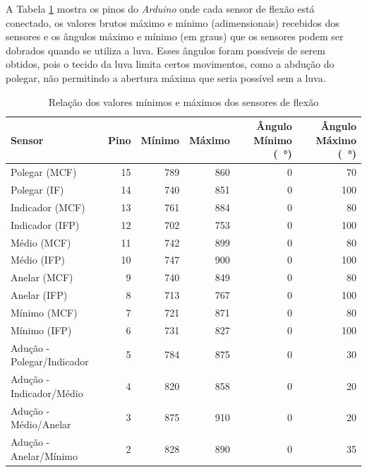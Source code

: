 A Tabela \ref{tab:sens_val} mostra os pinos do \textit{Arduino} onde cada sensor de flexão está conectado, os valores brutos máximo e mínimo (adimensionais) recebidos dos sensores e os ângulos máximo e mínimo (em graus) que os sensores podem ser dobrados quando se utiliza a luva. Esses ângulos foram possíveis de serem obtidos, pois o tecido da luva limita certos movimentos, como a abdução do polegar, não permitindo a abertura máxima que seria possível sem a luva.

\begin{table}[H]
    \centering
    \footnotesize
    \setlength{\abovecaptionskip}{0pt}
    \setlength{\belowcaptionskip}{0pt}
    \caption[Relação dos valores mínimos e máximos dos sensores de flexão]{Relação dos valores mínimos e máximos dos sensores de flexão}
    \label{tab:sens_val}
    \begin{tabular}{l r r r r r}
      \hline\hline
      Sensor & Pino & Mínimo & Máximo & Ângulo Mínimo (\SI{}{\degree}) & Ângulo Máximo (\SI{}{\degree})\\
      \hline
      Polegar (MCF)              & 15 & 789 & 860 & 0 & 70\\
      Polegar (IF)               & 14 & 740 & 851 & 0 & 100\\
      Indicador (MCF)            & 13 & 761 & 884 & 0 & 80\\
      Indicador (IFP)            & 12 & 702 & 753 & 0 & 100\\
      Médio (MCF)                & 11 & 742 & 899 & 0 & 80\\
      Médio (IFP)                & 10 & 747 & 900 & 0 & 100\\
      Anelar (MCF)               & 9  & 740 & 849 & 0 & 80\\
      Anelar (IFP)               & 8  & 713 & 767 & 0 & 100\\
      Mínimo (MCF)               & 7  & 721 & 871 & 0 & 80\\
      Mínimo (IFP)               & 6  & 731 & 827 & 0 & 100\\
      Adução - Polegar/Indicador & 5  & 784 & 875 & 0 & 30\\
      Adução - Indicador/Médio   & 4  & 820 & 858 & 0 & 20\\
      Adução - Médio/Anelar      & 3  & 875 & 910 & 0 & 20\\
      Adução - Anelar/Mínimo     & 2  & 828 & 890 & 0 & 35\\
      \hline \hline
    \end{tabular}
    \\\vspace{1.3mm}
\end{table}

